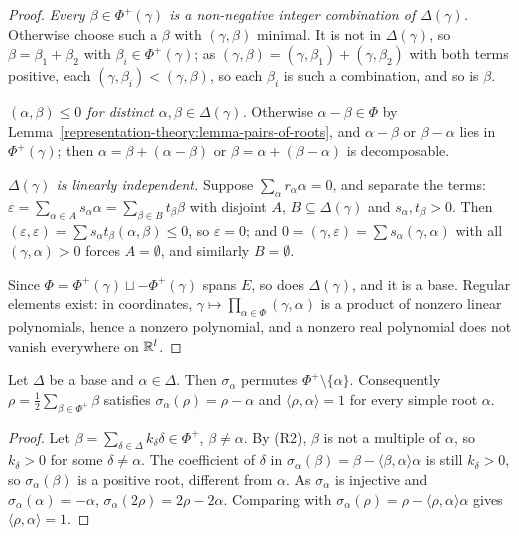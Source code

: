 \begin{proof}
\emph{Every $\beta \in \Phi^+(\gamma)$ is a non-negative integer combination of $\Delta(\gamma)$.} Otherwise choose such a $\beta$ with $(\gamma, \beta)$ minimal. It is not in
$\Delta(\gamma)$, so $\beta = \beta_1 + \beta_2$ with $\beta_i \in \Phi^+(\gamma)$; as $(\gamma, \beta) = (\gamma, \beta_1) + (\gamma, \beta_2)$ with both terms positive, each
$(\gamma, \beta_i) < (\gamma, \beta)$, so each $\beta_i$ is such a combination, and so is $\beta$.

\emph{$(\alpha, \beta) \leq 0$ for distinct $\alpha, \beta \in \Delta(\gamma)$.} Otherwise $\alpha - \beta \in \Phi$ by Lemma~\ref{representation-theory:lemma-pairs-of-roots}, and
$\alpha - \beta$ or $\beta - \alpha$ lies in $\Phi^+(\gamma)$; then $\alpha = \beta + (\alpha - \beta)$ or $\beta = \alpha + (\beta - \alpha)$ is decomposable.

\emph{$\Delta(\gamma)$ is linearly independent.} Suppose $\sum_\alpha r_\alpha\alpha = 0$, and separate the terms: $\varepsilon = \sum_{\alpha \in A}s_\alpha\alpha = \sum_{\beta \in B}t_\beta\beta$
with disjoint $A$, $B \subseteq \Delta(\gamma)$ and $s_\alpha, t_\beta > 0$. Then $(\varepsilon, \varepsilon) = \sum s_\alpha t_\beta(\alpha, \beta) \leq 0$, so $\varepsilon = 0$; and
$0 = (\gamma, \varepsilon) = \sum s_\alpha(\gamma, \alpha)$ with all $(\gamma, \alpha) > 0$ forces $A = \emptyset$, and similarly $B = \emptyset$.

Since $\Phi = \Phi^+(\gamma) \sqcup -\Phi^+(\gamma)$ spans $E$, so does $\Delta(\gamma)$, and it is a base. Regular elements exist: in coordinates, $\gamma \mapsto
\prod_{\alpha \in \Phi}(\gamma, \alpha)$ is a product of nonzero linear polynomials, hence a nonzero polynomial, and a nonzero real polynomial does not vanish everywhere on $\mathbb{R}^l$.
\end{proof}

\begin{lemma}\label{representation-theory:lemma-simple-reflection}
Let $\Delta$ be a base and $\alpha \in \Delta$. Then $\sigma_\alpha$ permutes $\Phi^+ \setminus \{\alpha\}$. Consequently $\rho = \frac12\sum_{\beta \in \Phi^+}\beta$ satisfies
$\sigma_\alpha(\rho) = \rho - \alpha$ and $\langle\rho, \alpha\rangle = 1$ for every simple root $\alpha$.
\end{lemma}

\begin{proof}
Let $\beta = \sum_{\delta \in \Delta}k_\delta\delta \in \Phi^+$, $\beta \neq \alpha$. By (R2), $\beta$ is not a multiple of $\alpha$, so $k_\delta > 0$ for some $\delta \neq \alpha$. The
coefficient of $\delta$ in $\sigma_\alpha(\beta) = \beta - \langle\beta, \alpha\rangle\alpha$ is still $k_\delta > 0$, so $\sigma_\alpha(\beta)$ is a positive root, different from $\alpha$.
As $\sigma_\alpha$ is injective and $\sigma_\alpha(\alpha) = -\alpha$, $\sigma_\alpha(2\rho) = 2\rho - 2\alpha$. Comparing with $\sigma_\alpha(\rho) = \rho - \langle\rho, \alpha\rangle\alpha$
gives $\langle\rho, \alpha\rangle = 1$.
\end{proof}

